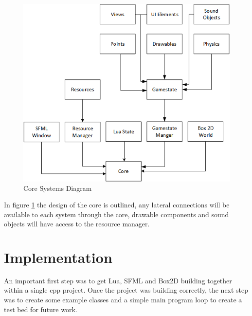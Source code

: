 \documentclass[11pt,a4paper,titlepage]{article}
\begin{document}
	\begin{figure}[h] 
		\centering
		\includegraphics[scale=0.75]{core1}
		\caption{Core Systems Diagram}
		\label{fig:CoreDiagram1}
	\end{figure}

	In figure \ref{fig:CoreDiagram1} the design of the core is outlined, any lateral connections will be available to each system through the core, drawable components and sound objects will have access to the resource manager.

	















\section{Implementation}

    
    An important first step was to get Lua, SFML and Box2D building together within a single cpp project. Once the project was building correctly, the next step was to create some example classes and a simple main program loop to create a test bed for future work.
\end{document}
